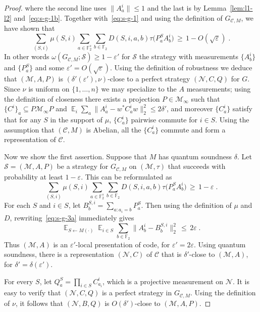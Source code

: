 \documentclass[11pt]{article}
\theoremstyle{definition}
\newcommand{\code}{\mathcal{C}}
\newcommand{\strategy}{\mathscr{S}}
\DeclareMathOperator*{\Expectation}{\mathbb{E}}
\newcommand{\Es}[1]{\Expectation_{#1}}
\newcommand{\field}{\mathbb{F}_2}
\newcommand{\mM}{\ensuremath{\mathcal{M}}}
\newcommand{\eps}{\varepsilon}
\newcommand{\mN}{\mathcal{N}}
\begin{document}
\begin{proof}
where the second line uses $\|A^i_a\|\leq 1$ and the last is by Lemma~\ref{lem:l1-l2} and~\eqref{eq:s-g-1b}.
Together with~\eqref{eq:s-g-1} and using the definition of $G_{\code,M}$, we have shown that
\begin{equation}
 \sum_{(S,i)} \mu(S,i) \sum_{a\in \field^s}\sum_{b\in\field} D(S,i,a,b) \tau\big(  P^S_a  A^i_{b}\big) \,\geq \,1-O(\sqrt{\eps})\;.\label{eq:s-g-2}
\end{equation}
In other words $\omega(G_{\code,M};\strategy)\geq 1-\eps'$ for $\strategy$ the strategy with measurements $\{A^i_b\}$ and $\{P^{S}_a\}$ and some $\eps'=O(\sqrt{\eps})$. Using the definition of robustness we deduce that $(\mM,A,P)$ is $(\delta'(\eps'),\nu)$-close to a perfect strategy $(\mN,C,Q)$ for $G$. Since $\nu$ is uniform on $\{1,\ldots,n\}$ we may specialize to the $A$ measurements; using the definition of closeness there exists a projection $P\in \mM_\infty$ such that $\{C^i\}_a \subseteq P\mM_\infty P$ and $\Es{i}\sum_a \|A^i_a-w^* C^i_a w \|_2^2 \leq 2\delta'$, and moreover $\{C^i_a\}$ satisfy that for any $S$ in the support of $\mu$, $\{C^i_a\}$ pairwise commute for $i\in S$. Using the assumption that $(\code,M)$ is Abelian, all the $\{C^i_a\}$ commute and form a representation of $\code$.

Now we show the first assertion. Suppose that $M$ has quantum soundness $\delta$.
Let $\strategy=(\mM,A,P)$ be a strategy for $G_{\code,M}$ on $(\mM,\tau)$ that succeeds with probability at least $1-\eps$. This can be reformulated as 
\begin{equation}
 \sum_{(S,i)} \mu(S,i) \sum_{a\in \field^s}\sum_{b\in\field} D(S,i,a,b) \tau\big(  P^S_a  A^i_{b}\big) \,\geq \,1-\eps\;.\label{eq:s-g-3a}
\end{equation}
For each $S$ and $i\in S$, let $B^{S,i}_b = \sum_{a:a_i=b} P^S_a$. Then using the definition of $\mu$ and $D$, rewriting~\eqref{eq:s-g-3a} immediately gives
\begin{equation}
 \Es{S\leftarrow M(\cdot)} \Es{i\in S} \sum_{b\in\field} \big\| A^i_{b} - B^{S,i}_b\big\|_2^2 \,\leq \,2\eps\;.\label{eq:s-g-3}
\end{equation}
Thus $(\mM,A)$ is an $\eps'$-local presentation of code, for $\eps'=2\eps$. Using quantum soundness, there is a representation $(\mN,C)$ of $\code$ that is $\delta'$-close to $(\mM,A)$, for $\delta'=\delta(\eps')$. 

For every $S$, let $Q^S_a = \prod_{i\in S} C^i_{a_i}$, which is a projective measurement on $\mN$. It is easy to verify that $(\mN,C,Q)$ is a perfect strategy in $G_{\code,M}$. Using the definition of $\nu$, it follows that   $(\mN,B,Q)$ is $O({\delta'})$-close to $(\mM,A,P)$.


\end{proof}
\end{document}
